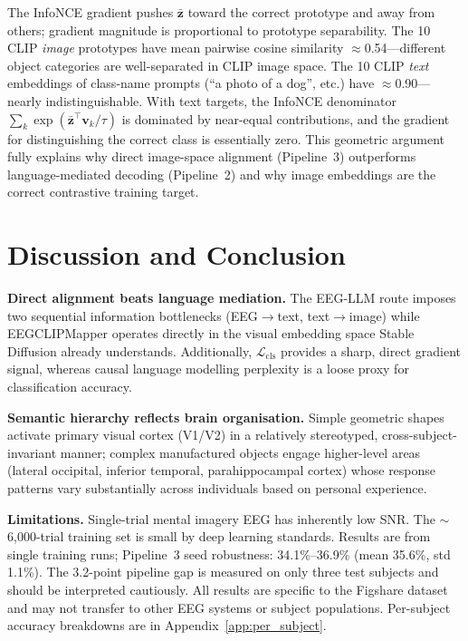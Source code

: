 \documentclass{article}
\begin{document}
The InfoNCE gradient pushes $\bar{\mathbf{z}}$ toward the correct prototype and away from others; gradient magnitude is proportional to prototype separability. The 10 CLIP \emph{image} prototypes have mean pairwise cosine similarity $\approx$0.54---different object categories are well-separated in CLIP image space. The 10 CLIP \emph{text} embeddings of class-name prompts (``a photo of a dog'', etc.) have $\approx$0.90---nearly indistinguishable. With text targets, the InfoNCE denominator $\sum_k\exp(\bar{\mathbf{z}}^\top\mathbf{v}_k/\tau)$ is dominated by near-equal contributions, and the gradient for distinguishing the correct class is essentially zero. This geometric argument fully explains why direct image-space alignment (Pipeline~3) outperforms language-mediated decoding (Pipeline~2) and why image embeddings are the correct contrastive training target.

\section{Discussion and Conclusion}

\textbf{Direct alignment beats language mediation.} The EEG-LLM route imposes two sequential information bottlenecks (EEG$\to$text, text$\to$image) while EEGCLIPMapper operates directly in the visual embedding space Stable Diffusion already understands. Additionally, $\mathcal{L}_\mathrm{cls}$ provides a sharp, direct gradient signal, whereas causal language modelling perplexity is a loose proxy for classification accuracy.

\textbf{Semantic hierarchy reflects brain organisation.} Simple geometric shapes activate primary visual cortex (V1/V2) in a relatively stereotyped, cross-subject-invariant manner; complex manufactured objects engage higher-level areas (lateral occipital, inferior temporal, parahippocampal cortex) whose response patterns vary substantially across individuals based on personal experience.

\textbf{Limitations.} Single-trial mental imagery EEG has inherently low SNR. The $\sim$6,000-trial training set is small by deep learning standards. Results are from single training runs; Pipeline~3 seed robustness: 34.1\%--36.9\% (mean 35.6\%, std 1.1\%). The 3.2-point pipeline gap is measured on only three test subjects and should be interpreted cautiously. All results are specific to the Figshare dataset and may not transfer to other EEG systems or subject populations. Per-subject accuracy breakdowns are in Appendix~\ref{app:per_subject}.
\end{document}
